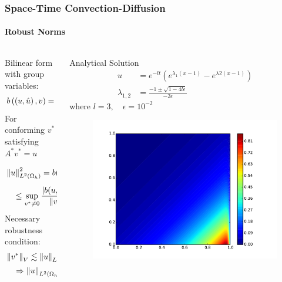 \documentclass[18pt,xcolor=table]{beamer}
\begin{document}
\begin{frame}[t]
\frametitle{Space-Time Convection-Diffusion}
\framesubtitle{Robust Norms}
\begin{columns}[t]
\begin{column}{0.5\textwidth}
\vspace{-3ex}

Bilinear form with group variables:
\[
b\left( \left( u,\hat u \right),v \right) = \left( u,A^*_h v \right)_{L^2\left( \Omega_h \right)} + \left\langle \widehat{u}, \left[ \![v]\! \right] \right\rangle_{\Gamma_h}
\]
For conforming $v^*$ satisfying $A^* v^* = u$
\begin{align*}
&\left\| u \right\|_{L^2\left( \Omega_h \right)}^2= b(u,v^*)
=\frac{b(u,v^*)}{\left\| v^* \right\|_V} \left\| v^* \right\|_V\\
&\quad\leq\sup_{v^*\neq0}\frac{|b(u,v^*)|}{\left\| v^* \right\|}\left\| v^* \right\|
=\left\| u \right\|_E \left\| v^* \right\|_V
\end{align*}
Necessary robustness condition:
\begin{align*}
&\left\| v^* \right\|_V\lesssim\left\| u \right\|_{L^2(\Omega_h)}\\
&\quad\Rightarrow\left\| u \right\|_{L^2(\Omega_h)}\lesssim\left\| u \right\|_E
\end{align*}
\end{column}
\begin{column}{0.5\textwidth}
\vspace{-3ex}
\centering

Analytical Solution
\begin{align*}
u&=e^{-lt}(e^{\lambda_1(x-1)}-e^{\lambda2(x-1)})\\
\lambda_{1,2}&=\frac{-1\pm\sqrt{1-4l\epsilon}}{-2\epsilon}
\end{align*}
where $l=3, \quad\epsilon = 10^{-2}$
\vspace{-3ex}
\begin{figure}[t]
\centering
\includegraphics[width=\textwidth]{figs/SpaceTimeAnalyticalExact}
\end{figure}
\end{column}
\end{columns}
\end{frame}
\end{document}

